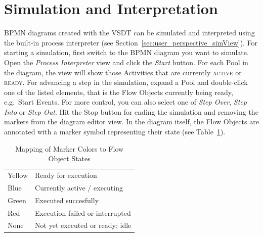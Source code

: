 \section{Simulation and Interpretation}
\label{sec:user_features_sim}

BPMN diagrams created with the VSDT can be simulated and interpreted using the
built-in process interpreter (see Section~\ref{sec:user_perspective_simView}).
For starting a simulation, first switch to the BPMN diagram you want to simulate.
Open the \emph{Process Interpreter} view and click the \emph{Start} button.  For
each Pool in the diagram, the view will show those Activities that are currently
\textsc{active} or \textsc{ready}.  For advancing a step in the simulation, expand
a Pool and double-click one of the listed elements, that is the Flow Objects
currently being ready, e.g.\ Start Events.  For more control, you can also select
one of \emph{Step Over}, \emph{Step Into} or \emph{Step Out}.  Hit the Stop button
for ending the simulation and removing the markers from the diagram editor view.
In the diagram itself, the Flow Objects are annotated with a marker symbol
representing their state (see Table~\ref{tab:markerColors}).
\begin{table}[ht]
	\centering
	\caption{Mapping of Marker Colors to Flow Object States}
	\label{tab:markerColors}
	\begin{tabular}{|l|l|}
		\hline
		Yellow & Ready for execution             \\
		Blue   & Currently active / executing    \\
		Green  & Executed succesfully            \\
		Red    & Execution failed or interrupted \\
		None   & Not yet executed or ready; idle \\
		\hline
	\end{tabular}
\end{table}

